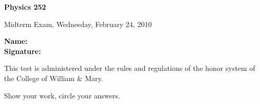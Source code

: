 \documentclass[letterpaper,addpoints,answers]{exam}
\begin{document}

\begin{coverpages}
	\noindent 
  \large\bfseries Physics 252

  \vspace{2ex}
	\noindent 
  Midterm Exam, Wednesday,  February  24, 2010

  \vspace{5ex}
	\noindent 
  \large\bfseries Name:\enspace\makebox[2in]{\hrulefill}\\

  \vspace{5ex}
	\noindent 
  \large\bfseries Signature:\enspace\makebox[2in]{\hrulefill}

  \vspace{5ex}
	\noindent 
	This test is administered under the rules and regulations of the honor 
	system of the College of William \& Mary.  

  \vspace{5ex}
	\noindent 
	Show your work, circle your answers.


  \vspace{5ex}
  \gradetable[v][questions]
\end{coverpages}
 
\end{document}

